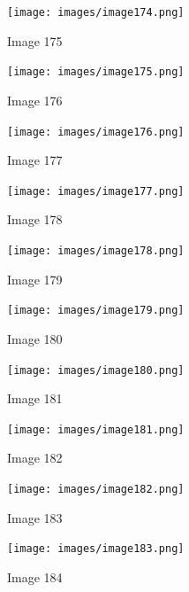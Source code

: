 \documentclass{article}%
\begin{document}
%


\begin{figure}[h!]%
\centering%
\texttt{[image: images/image174.png]}%
\caption{Image 175}%
\end{figure}

%


\begin{figure}[h!]%
\centering%
\texttt{[image: images/image175.png]}%
\caption{Image 176}%
\end{figure}

%


\begin{figure}[h!]%
\centering%
\texttt{[image: images/image176.png]}%
\caption{Image 177}%
\end{figure}

%


\begin{figure}[h!]%
\centering%
\texttt{[image: images/image177.png]}%
\caption{Image 178}%
\end{figure}

%


\begin{figure}[h!]%
\centering%
\texttt{[image: images/image178.png]}%
\caption{Image 179}%
\end{figure}

%


\begin{figure}[h!]%
\centering%
\texttt{[image: images/image179.png]}%
\caption{Image 180}%
\end{figure}

%


\begin{figure}[h!]%
\centering%
\texttt{[image: images/image180.png]}%
\caption{Image 181}%
\end{figure}

%


\begin{figure}[h!]%
\centering%
\texttt{[image: images/image181.png]}%
\caption{Image 182}%
\end{figure}

%


\begin{figure}[h!]%
\centering%
\texttt{[image: images/image182.png]}%
\caption{Image 183}%
\end{figure}

%


\begin{figure}[h!]%
\centering%
\texttt{[image: images/image183.png]}%
\caption{Image 184}%
\end{figure}
\end{document}
